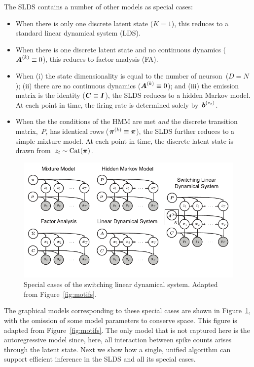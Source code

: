 The SLDS contains a number of other models as special cases:
\begin{itemize}
\item When there is only one discrete latent state ($K=1$), this
  reduces to a standard linear dynamical system (LDS).
  
\item When there is one discrete latent state and no continuous dynamics
  (${\boldsymbol{A}^{(k)} \equiv 0}$), this reduces to factor analysis (FA).

\item When (i) the state dimensionality is equal to the number of
  neurson~($D=N$); (ii) there are no continuous dynamics (${\boldsymbol{A}^{(k)}
    \equiv 0}$); and (iii) the emission matrix is the identity (${\boldsymbol{C}
    \equiv \boldsymbol{I}}$), the SLDS reduces to a hidden Markov model. At each
  point in time, the firing rate is determined solely
  by~$\boldsymbol{b}^{(z_t)}$.

\item When the the conditions of the HMM are met \emph{and} the
  discrete transition matrix,~$P$, has identical rows (${\boldsymbol{\pi}^{(k)}
    \equiv \boldsymbol{\pi}}$), the SLDS further reduces to a simple mixture
  model. At each point in time, the discrete latent state is drawn
  from~${z_t \sim \mathrm{Cat}(\boldsymbol{\pi})}$.
\end{itemize}

\begin{figure}[t]
  \centering%
\includegraphics[width=5.5in]{figures/ch8/graphical_models} 
\vspace{-.25in}
\caption{Special cases of the switching linear dynamical system.
  Adapted from Figure~\ref{fig:motifs}.}
\label{fig:slds_models}
\end{figure}

The graphical models corresponding to these special cases are shown in
Figure~\ref{fig:slds_models}, with the omission of some model
parameters to conserve space. This figure is adapted from
Figure~\ref{fig:motifs}. The only model that is not captured here
is the autoregressive model since, here, all interaction between
spike counts arises through the latent state. Next we show how
a single, unified algorithm can support efficient
inference in the SLDS and all its special cases.


